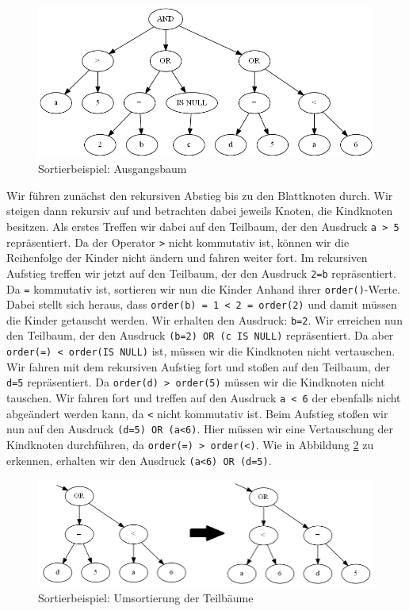 \begin{figure}[h]
\includegraphics[scale=0.6]{Bilder/sort_1.png}
\caption{Sortierbeispiel: Ausgangsbaum}
\label{fig:sort_1}
\end{figure}

Wir führen zunächst den rekursiven Abstieg bis zu den Blattknoten durch. Wir steigen dann rekursiv auf und betrachten dabei jeweils Knoten, die Kindknoten besitzen. Als erstes Treffen wir dabei auf den Teilbaum, der den Ausdruck \verb|a > 5| repräsentiert. Da der Operator \verb|>| nicht kommutativ ist, können wir die Reihenfolge der Kinder nicht ändern und fahren weiter fort. Im rekursiven Aufstieg treffen wir jetzt auf den Teilbaum, der den Ausdruck \verb|2=b| repräsentiert. Da \verb|=| kommutativ ist, sortieren wir nun die Kinder Anhand ihrer \verb|order()|-Werte. Dabei stellt sich heraus, dass \verb|order(b) = 1 < 2 = order(2)| und damit müssen die Kinder getauscht werden. Wir erhalten den Ausdruck: \verb|b=2|. 
Wir erreichen nun den Teilbaum, der den Ausdruck \verb|(b=2) OR (c IS NULL)| repräsentiert. Da aber \verb|order(=) < order(IS NULL)| ist, müssen wir die Kindknoten nicht vertauschen.
Wir fahren mit dem rekursiven Aufstieg fort und stoßen auf den Teilbaum, der \verb|d=5| repräsentiert. Da \verb|order(d) > order(5)| müssen wir die Kindknoten nicht tauschen. Wir fahren fort und treffen auf den Ausdruck \verb|a < 6| der ebenfalls nicht abgeändert werden kann, da \verb|<| nicht kommutativ ist. 
Beim Aufstieg stoßen wir nun auf den Ausdruck \verb|(d=5) OR (a<6)|. Hier müssen wir eine Vertauschung der Kindknoten durchführen, da \verb|order(=) > order(<)|. Wie in Abbildung \ref{fig:sort_step1} zu erkennen, erhalten wir den Ausdruck \verb|(a<6) OR (d=5)|.

\begin{figure}[h]
\centering
\includegraphics[scale=0.5]{Bilder/sort_step1.png}
\caption{Sortierbeispiel: Umsortierung der Teilbäume}
\label{fig:sort_step1}
\end{figure}

